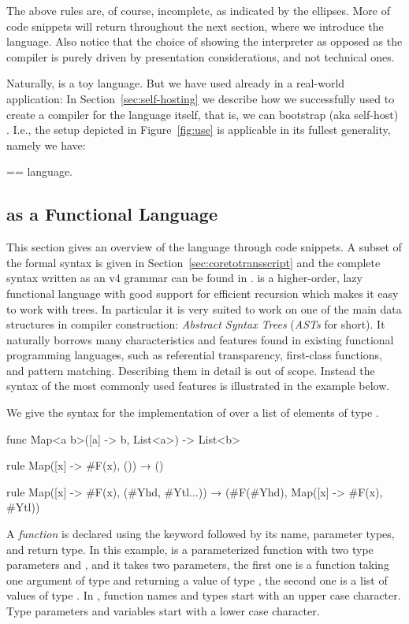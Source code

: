The above rules are, of course, incomplete, as indicated by the ellipses. More
of \MiniML code snippets will return throughout the next section,
where we introduce the \Tosca language. Also notice that the choice
of showing the \MiniML interpreter as opposed as the compiler is purely
driven by presentation considerations, and not technical ones.  

Naturally, \MiniML is a toy language.  But we have used \Tosca already
in a real-world application: In Section~\ref{sec:self-hosting} we
describe how we successfully used \Tosca to create a compiler for the
\Tosca language itself, that is, we can bootstrap (aka self-host)
\Tosca. I.e., the setup depicted in Figure~\ref{fig:use} is
applicable in its fullest generality, namely we have:
%
\begin{center}
  \PL == \Tosca language.
\end{center}
%

\subsection{\Tosca as a Functional Language} \label{sec:language}

This section gives an overview of the \Tosca language through
code snippets. A subset of the formal syntax is given in 
Section~\ref{sec:coretotransscript} and the complete \Tosca syntax
written as an \antlr v4 grammar can be found in 
%
        {}{}.
%
\Tosca is a higher-order, lazy functional language with good support for efficient
recursion which makes it easy to work with trees.
In particular it is very suited to work on 
one of the main data structures in compiler construction: 
\emph{Abstract Syntax Trees} (\emph{ASTs} for short). 
It naturally borrows many characteristics and features found in
existing functional programming languages, such as referential
transparency, first-class functions, and pattern matching.
%
Describing them in detail is out of scope.
Instead the syntax of the  most commonly used features is illustrated
in the example below.
%
\begin{example} \label{ex:map} %
We give the \Tosca syntax for the implementation of
 over a list of elements of type .
%
\begin{lstTosca}
func Map<a b>([a] -> b, List<a>) -> List<b>
 
rule Map([x] -> #F(x), ())          
  → ()

rule Map([x] -> #F(x), (#Yhd, #Ytl...)) 
  → (#F(#Yhd), Map([x] -> #F(x), #Ytl))
\end{lstTosca}
\end{example}
%
A \emph{function} is declared using the keyword 
followed by its name, parameter types, and return type. In this
example,  is a parameterized function with two type
parameters  and ,  
and it takes two parameters, the first
one is a function taking one argument of type  and
returning a value of type , the second one is a list
of values of type . 
In \Tosca, function names and types start with an upper case character. 
Type parameters and variables start with a lower case character.

